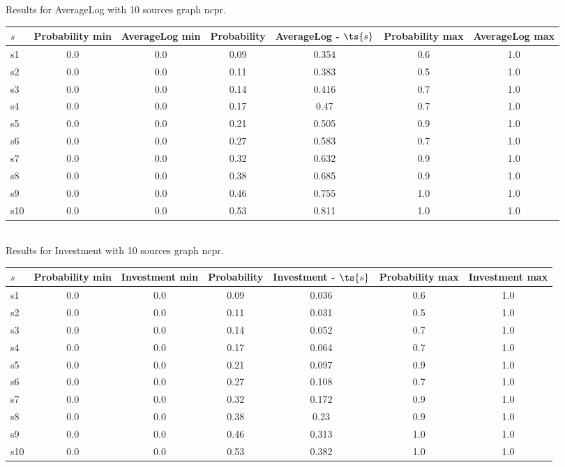\documentclass{article}
\begin{document}
\noindent Results for AverageLog with 10 sources graph ncpr.

\noindent\begin{tabular}{|l|c|c|c|c|c|c|}
\hline
$s$& Probability min & AverageLog min & Probability & AverageLog - $\ts{s}$ & Probability max & AverageLog max\\
\hline
s1 &0.0 & 0.0 & 0.09 & 0.354 & 0.6 & 1.0\\
\hline
s2 &0.0 & 0.0 & 0.11 & 0.383 & 0.5 & 1.0\\
\hline
s3 &0.0 & 0.0 & 0.14 & 0.416 & 0.7 & 1.0\\
\hline
s4 &0.0 & 0.0 & 0.17 & 0.47 & 0.7 & 1.0\\
\hline
s5 &0.0 & 0.0 & 0.21 & 0.505 & 0.9 & 1.0\\
\hline
s6 &0.0 & 0.0 & 0.27 & 0.583 & 0.7 & 1.0\\
\hline
s7 &0.0 & 0.0 & 0.32 & 0.632 & 0.9 & 1.0\\
\hline
s8 &0.0 & 0.0 & 0.38 & 0.685 & 0.9 & 1.0\\
\hline
s9 &0.0 & 0.0 & 0.46 & 0.755 & 1.0 & 1.0\\
\hline
s10 &0.0 & 0.0 & 0.53 & 0.811 & 1.0 & 1.0\\
\hline
\end{tabular}\\

\noindent Results for Investment with 10 sources graph ncpr.

\noindent\begin{tabular}{|l|c|c|c|c|c|c|}
\hline
$s$& Probability min & Investment min & Probability & Investment - $\ts{s}$ & Probability max & Investment max\\
\hline
s1 &0.0 & 0.0 & 0.09 & 0.036 & 0.6 & 1.0\\
\hline
s2 &0.0 & 0.0 & 0.11 & 0.031 & 0.5 & 1.0\\
\hline
s3 &0.0 & 0.0 & 0.14 & 0.052 & 0.7 & 1.0\\
\hline
s4 &0.0 & 0.0 & 0.17 & 0.064 & 0.7 & 1.0\\
\hline
s5 &0.0 & 0.0 & 0.21 & 0.097 & 0.9 & 1.0\\
\hline
s6 &0.0 & 0.0 & 0.27 & 0.108 & 0.7 & 1.0\\
\hline
s7 &0.0 & 0.0 & 0.32 & 0.172 & 0.9 & 1.0\\
\hline
s8 &0.0 & 0.0 & 0.38 & 0.23 & 0.9 & 1.0\\
\hline
s9 &0.0 & 0.0 & 0.46 & 0.313 & 1.0 & 1.0\\
\hline
s10 &0.0 & 0.0 & 0.53 & 0.382 & 1.0 & 1.0\\
\hline
\end{tabular}\\
\end{document}
